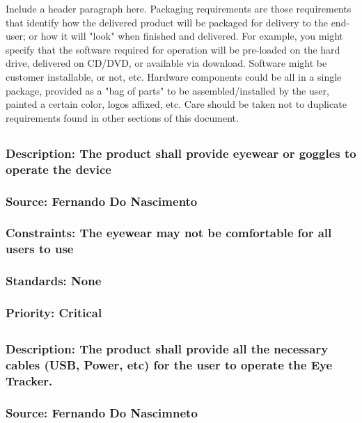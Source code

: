Include a header paragraph here. Packaging requirements are those requirements that identify how the delivered product will be packaged for delivery to the end-user; or how it will "look" when finished and delivered. For example, you might specify that the software required for operation will be pre-loaded on the hard drive, delivered on CD/DVD, or available via download. Software might be customer installable, or not, etc. Hardware components could be all in a single package, provided as a "bag of parts" to be assembled/installed by the user, painted a certain color, logos affixed, etc. Care should be taken not to duplicate requirements found in other sections of this document.

\subsection{\bfEyewear}
\subsubsection{Description: The product shall provide eyewear or goggles to operate the device}
\subsubsection{Source: Fernando Do Nascimento}
\subsubsection{Constraints: The eyewear may not be comfortable for all users to use}
\subsubsection{Standards: None}
\subsubsection{Priority: Critical}

\subsection{\bfCables}
\subsubsection{Description: The product shall provide all the necessary cables (USB, Power, etc) for the user to operate the Eye Tracker.}
\subsubsection{Source: Fernando Do Nascimneto}
